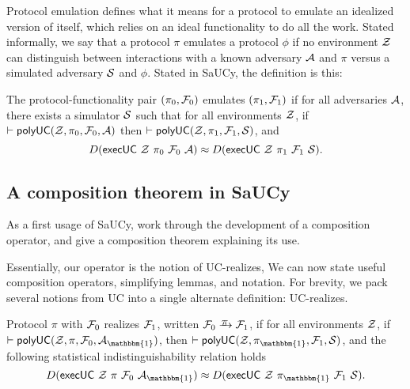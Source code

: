 Protocol emulation defines what it means for a protocol to emulate an idealized
version of itself, which relies on an ideal functionality to do all the
work. Stated informally, we say that a protocol $\pi$ emulates a protocol $\phi$ if no
environment $\mathcal{{Z}}$ can distinguish between interactions with a known adversary
$\mathcal{{A}}$ and $\pi$ versus a simulated adversary $\mathcal{{S}}$ and $\phi$. Stated in SaUCy,
the definition is this:
\begin{definition}[Emulation]
  The protocol-functionality pair $(\pi_0, \mathcal{{F}}_0)$ emulates $(\pi_1, \mathcal{{F}}_1)$
  if for all adversaries $\mathcal{{A}}$, there exists a simulator $\mathcal{{S}}$
  such that for all environments $\mathcal{{Z}}$, if $|- \text{\textsf{polyUC}}(\mathcal{{Z}}, \pi_0,
  \mathcal{{F}}_0, \mathcal{{A}})$ then $|- \text{\textsf{polyUC}}(\mathcal{{Z}}, \pi_1, \mathcal{{F}}_1, \mathcal{{S}})$,
  and
  \[ D(\mathsf{execUC}\ \mc{Z}\ \pi_0\ \mc{F}_0\ \mc{A}) \approx D(\mathsf{execUC}\ \mc{Z}\ \pi_1\ \mc{F}_1\ \mc{S}).\]
\end{definition}

\subsection{A composition theorem in SaUCy}
\label{subsec:composition}

As a first usage of SaUCy, work through the development of a composition
operator, and give a composition theorem explaining its use.


Essentially, our operator is the notion of UC-realizes, We can now state useful
composition operators, simplifying lemmas, and notation. For brevity, we pack
several notions from UC into a single alternate definition: UC-realizes.

\begin{definition}[UC-realizes]
  Protocol $\pi$ with $\mathcal{{F}}_0$ realizes $\mathcal{{F}}_1$, written $\mc{F}_0
  \yrightarrow{$\pi$} \mc{F}_1$, if for all environments $\mathcal{{Z}}$, if $|-
  \keyword{polyUC}(\mc{Z}, \pi, \mc{F}_0, \mc{A}_{\mathbbm{1}})$, then
  $|- \keyword{polyUC}(\mc{Z}, \pi_{\mathbbm{1}}, \mc{F}_1, \mc{S})$, and the
  following statistical indistinguishability relation holds
  \[ D(\mathsf{execUC}\ \mc{Z}\ \pi\ \mc{F}_0\ \mc{A}_{\mathbbm{1}}) \approx D(\mathsf{execUC}\ \mc{Z}\ \pi_{\mathbbm{1}}\ \mc{F}_1\ \mc{S}).\]
\end{definition}

